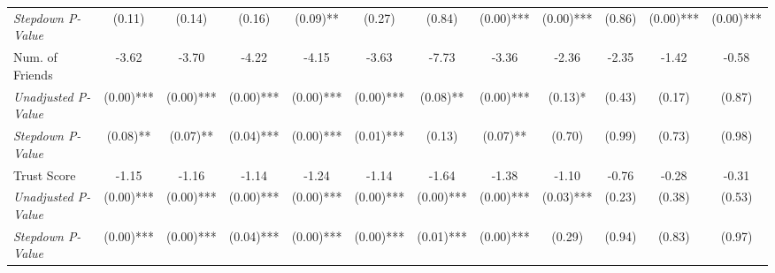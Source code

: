 \begin{tabular}{l c c c c c c c c c c c}
\quad \textit{Stepdown P-Value} & (0.11) & (0.14) & (0.16) & (0.09)** & (0.27) & (0.84) & (0.00)*** & (0.00)*** & (0.86) & (0.00)*** & (0.00)*** \\
Num. of Friends & -3.62 & -3.70 & -4.22 & -4.15 & -3.63 & -7.73 & -3.36 & -2.36 & -2.35 & -1.42 & -0.58 \\
\quad \textit{Unadjusted P-Value} & (0.00)*** & (0.00)*** & (0.00)*** & (0.00)*** & (0.00)*** & (0.08)** & (0.00)*** & (0.13)* & (0.43) & (0.17) & (0.87) \\
\quad \textit{Stepdown P-Value} & (0.08)** & (0.07)** & (0.04)*** & (0.00)*** & (0.01)*** & (0.13) & (0.07)** & (0.70) & (0.99) & (0.73) & (0.98) \\
Trust Score & -1.15 & -1.16 & -1.14 & -1.24 & -1.14 & -1.64 & -1.38 & -1.10 & -0.76 & -0.28 & -0.31 \\
\quad \textit{Unadjusted P-Value} & (0.00)*** & (0.00)*** & (0.00)*** & (0.00)*** & (0.00)*** & (0.00)*** & (0.00)*** & (0.03)*** & (0.23) & (0.38) & (0.53) \\
\quad \textit{Stepdown P-Value} & (0.00)*** & (0.00)*** & (0.04)*** & (0.00)*** & (0.00)*** & (0.01)*** & (0.00)*** & (0.29) & (0.94) & (0.83) & (0.97) \\
\bottomrule
\end{tabular}
